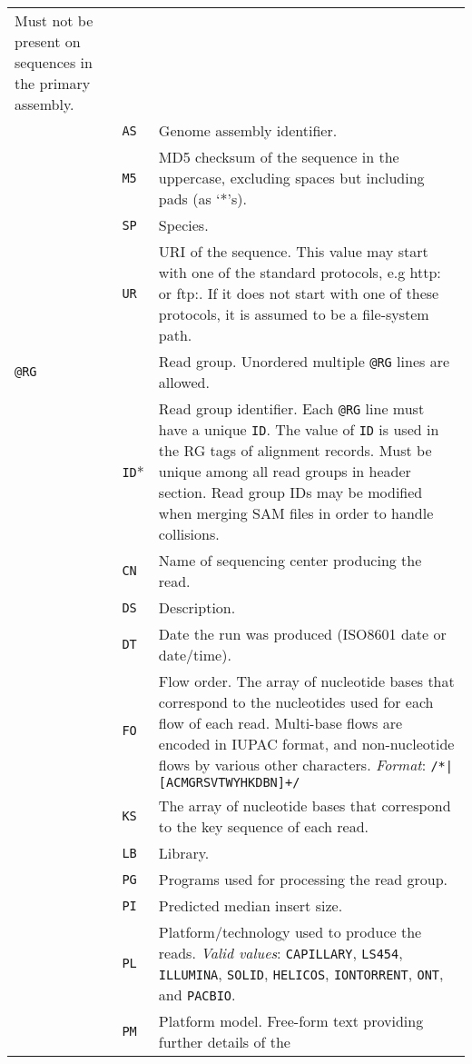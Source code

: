 \documentclass[10pt]{article}
\begin{document}
\begin{center}
\begin{longtable}{|l|l|p{13.5cm}|}
  Must not be present on sequences in the primary assembly.\\\cline{2-3}
  & {\tt AS} & Genome assembly identifier. \\\cline{2-3}
  & {\tt M5} & MD5 checksum of the sequence in the uppercase, excluding spaces but including pads (as `*'s).\\\cline{2-3}
  & {\tt SP} & Species.\\\cline{2-3}
  & {\tt UR} & URI of the sequence.  This value may start with one of the standard
  protocols, e.g http: or ftp:.  If it does not start with one of these protocols, it is assumed to be a file-system path.\\\cline{1-3}
  \multicolumn{2}{|l}{\tt @RG} & Read group. Unordered multiple {\tt @RG} lines are allowed.\\\cline{2-3}
  & {\tt ID}* & Read group identifier. Each {\tt @RG} line must have a unique {\tt ID}. The value of {\tt ID}
  is used in the RG tags of alignment records. Must be unique among all read groups in header section.  Read group IDs may be modified when merging SAM files in order to handle collisions.\\\cline{2-3}
  & {\tt CN} & Name of sequencing center producing the read.\\\cline{2-3}
  & {\tt DS} & Description.\\\cline{2-3}
  & {\tt DT} & Date the run was produced (ISO8601 date or date/time).\\\cline{2-3}
  & {\tt FO} & Flow order. The array of nucleotide bases that correspond to the nucleotides used for each flow of each read.
  	Multi-base flows are encoded in IUPAC format, and non-nucleotide flows by various other characters. \emph{Format}: {\tt /\char92*|[ACMGRSVTWYHKDBN]+/}\\\cline{2-3}
  & {\tt KS} & The array of nucleotide bases that correspond to the key sequence of each read.\\\cline{2-3}
  & {\tt LB} & Library.\\\cline{2-3}
  & {\tt PG} & Programs used for processing the read group.\\\cline{2-3}
  & {\tt PI} & Predicted median insert size.\\\cline{2-3}
  & {\tt PL} & Platform/technology used to produce the reads. \emph{Valid values}:
  {\tt CAPILLARY}, {\tt LS454}, {\tt ILLUMINA}, {\tt SOLID}, {\tt HELICOS}, {\tt IONTORRENT}, {\tt ONT}, and {\tt PACBIO}.\\\cline{2-3}
  & {\tt PM} & Platform model. Free-form text providing further details of the

\end{longtable}
\end{center}
\end{document}

